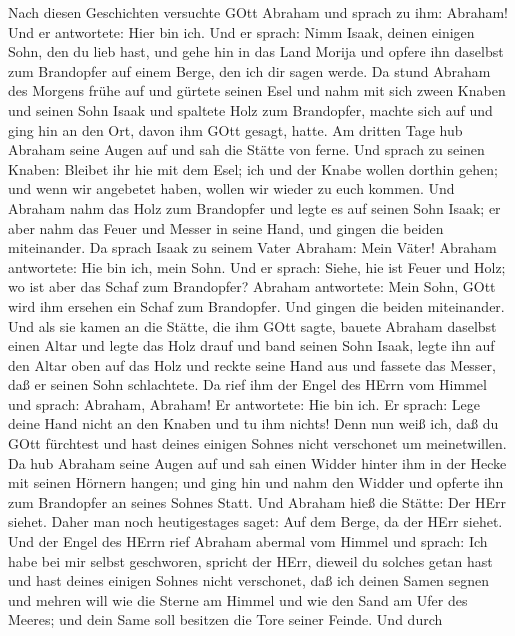  Nach diesen Geschichten versuchte GOtt Abraham und sprach
zu ihm: Abraham! Und er antwortete: Hier bin ich.  Und er
sprach: Nimm Isaak, deinen einigen Sohn, den du lieb hast, und gehe hin
in das Land Morija und opfere ihn daselbst zum Brandopfer auf einem
Berge, den ich dir sagen werde.  Da stund Abraham des
Morgens frühe auf und gürtete seinen Esel und nahm mit sich zween Knaben
und seinen Sohn Isaak und spaltete Holz zum Brandopfer, machte sich auf
und ging hin an den Ort, davon ihm GOtt gesagt, hatte.  Am
dritten Tage hub Abraham seine Augen auf und sah die Stätte von ferne.
 Und sprach zu seinen Knaben: Bleibet ihr hie mit dem Esel;
ich und der Knabe wollen dorthin gehen; und wenn wir angebetet haben,
wollen wir wieder zu euch kommen.  Und Abraham nahm das Holz
zum Brandopfer und legte es auf seinen Sohn Isaak; er aber nahm das
Feuer und Messer in seine Hand, und gingen die beiden miteinander.
 Da sprach Isaak zu seinem Vater Abraham: Mein Väter!
Abraham antwortete: Hie bin ich, mein Sohn. Und er sprach: Siehe, hie
ist Feuer und Holz; wo ist aber das Schaf zum Brandopfer? 
Abraham antwortete: Mein Sohn, GOtt wird ihm ersehen ein Schaf zum
Brandopfer. Und gingen die beiden miteinander.  Und als sie
kamen an die Stätte, die ihm GOtt sagte, bauete Abraham daselbst einen
Altar und legte das Holz drauf und band seinen Sohn Isaak, legte ihn auf
den Altar oben auf das Holz  und reckte seine Hand aus und
fassete das Messer, daß er seinen Sohn schlachtete.  Da
rief ihm der Engel des HErrn vom Himmel und sprach: Abraham, Abraham! Er
antwortete: Hie bin ich.  Er sprach: Lege deine Hand nicht
an den Knaben und tu ihm nichts! Denn nun weiß ich, daß du GOtt
fürchtest und hast deines einigen Sohnes nicht verschonet um
meinetwillen.  Da hub Abraham seine Augen auf und sah einen
Widder hinter ihm in der Hecke mit seinen Hörnern hangen; und ging hin
und nahm den Widder und opferte ihn zum Brandopfer an seines Sohnes
Statt.  Und Abraham hieß die Stätte: Der HErr siehet. Daher
man noch heutigestages saget: Auf dem Berge, da der HErr siehet.
 Und der Engel des HErrn rief Abraham abermal vom Himmel
 und sprach: Ich habe bei mir selbst geschworen, spricht
der HErr, dieweil du solches getan hast und hast deines einigen Sohnes
nicht verschonet,  daß ich deinen Samen segnen und mehren
will wie die Sterne am Himmel und wie den Sand am Ufer des Meeres; und
dein Same soll besitzen die Tore seiner Feinde.  Und durch
